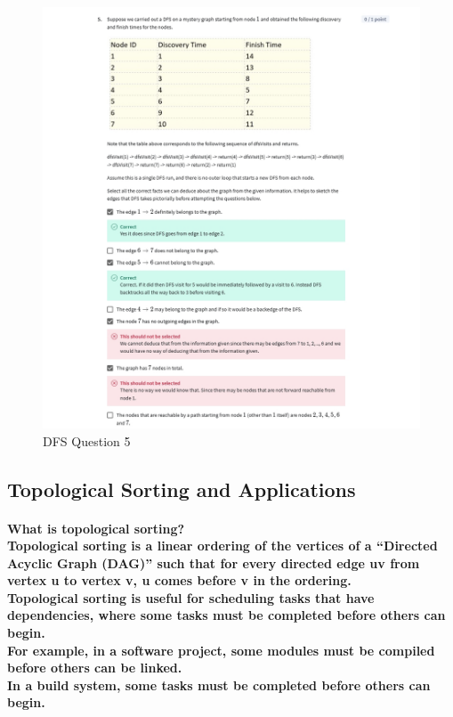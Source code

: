 \documentclass{article}
\begin{document}
\begin{figure}[H]
    \includegraphics[width=\textwidth]{dfsquiz-5.png}
    \caption{DFS Question 5}
\end{figure}


\subsection{Topological Sorting and Applications}

\paragraph{
    What is topological sorting?\\
    Topological sorting is a linear ordering of the vertices of a ``Directed Acyclic Graph (DAG)'' 
    such that for every directed edge uv from vertex u to vertex v, u comes before v in the ordering.\\
    Topological sorting is useful for scheduling tasks that have dependencies, 
    where some tasks must be completed before others can begin.\\
    For example, in a software project, some modules must be compiled before others can be linked.\\
    In a build system, some tasks must be completed before others can begin.\\
}
\end{document}
